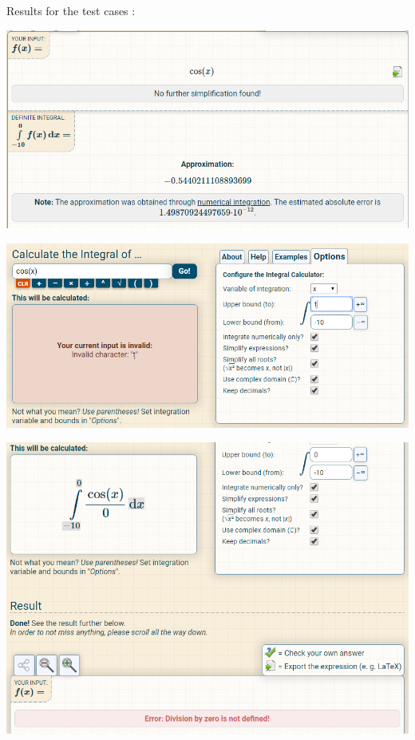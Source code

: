Results for the test cases : 


\begin{center}
	\includegraphics[scale=0.7]{images/Case1}
	\vspace{1cm}
\end{center}


\begin{center}
	\includegraphics[scale=0.7]{images/Case2}
	\vspace{1cm}
\end{center}


\begin{center}
	\includegraphics[scale=0.7]{images/Case3}
	\vspace{1cm}
\end{center}


